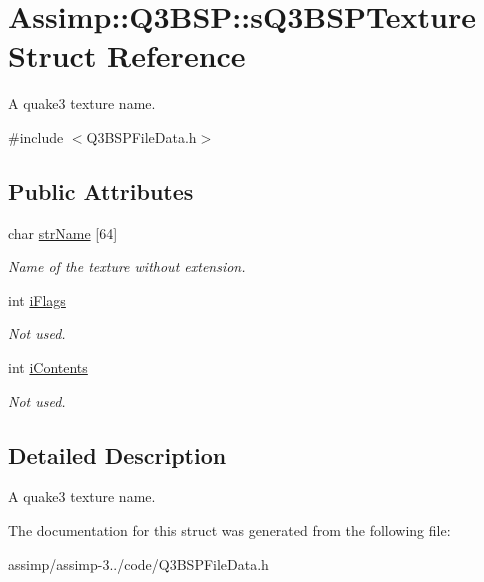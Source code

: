 \hypertarget{struct_assimp_1_1_q3_b_s_p_1_1s_q3_b_s_p_texture}{\section{Assimp\+:\+:Q3\+B\+S\+P\+:\+:s\+Q3\+B\+S\+P\+Texture Struct Reference}
\label{struct_assimp_1_1_q3_b_s_p_1_1s_q3_b_s_p_texture}
}


A quake3 texture name.  




{\ttfamily \#include $<$Q3\+B\+S\+P\+File\+Data.\+h$>$}

\subsection*{Public Attributes}
\begin{DoxyCompactItemize}
\item 
\hypertarget{struct_assimp_1_1_q3_b_s_p_1_1s_q3_b_s_p_texture_ad68d716afe45c6c2e7c836cb02308c68}{char \hyperlink{struct_assimp_1_1_q3_b_s_p_1_1s_q3_b_s_p_texture_ad68d716afe45c6c2e7c836cb02308c68}{str\+Name} \mbox{[}64\mbox{]}}\label{struct_assimp_1_1_q3_b_s_p_1_1s_q3_b_s_p_texture_ad68d716afe45c6c2e7c836cb02308c68}

\begin{DoxyCompactList}\small\item\em Name of the texture without extension. \end{DoxyCompactList}\item 
\hypertarget{struct_assimp_1_1_q3_b_s_p_1_1s_q3_b_s_p_texture_a80fe4c667630bebbd3497bc144782f29}{int \hyperlink{struct_assimp_1_1_q3_b_s_p_1_1s_q3_b_s_p_texture_a80fe4c667630bebbd3497bc144782f29}{i\+Flags}}\label{struct_assimp_1_1_q3_b_s_p_1_1s_q3_b_s_p_texture_a80fe4c667630bebbd3497bc144782f29}

\begin{DoxyCompactList}\small\item\em Not used. \end{DoxyCompactList}\item 
\hypertarget{struct_assimp_1_1_q3_b_s_p_1_1s_q3_b_s_p_texture_ac1d6a9cc0c33521f38ec35bf6aad8777}{int \hyperlink{struct_assimp_1_1_q3_b_s_p_1_1s_q3_b_s_p_texture_ac1d6a9cc0c33521f38ec35bf6aad8777}{i\+Contents}}\label{struct_assimp_1_1_q3_b_s_p_1_1s_q3_b_s_p_texture_ac1d6a9cc0c33521f38ec35bf6aad8777}

\begin{DoxyCompactList}\small\item\em Not used. \end{DoxyCompactList}\end{DoxyCompactItemize}


\subsection{Detailed Description}
A quake3 texture name. 

The documentation for this struct was generated from the following file\+:\begin{DoxyCompactItemize}
\item 
assimp/assimp-\/3../code/Q3\+B\+S\+P\+File\+Data.\+h\end{DoxyCompactItemize}

